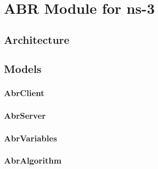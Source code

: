 \chapter{ABR Module for ns-3}
\label{chap:abrmodule}

\section{Architecture}



\section{Models}

\subsection{AbrClient}

\subsection{AbrServer}

\subsection{AbrVariables}

\subsection{AbrAlgorithm}
